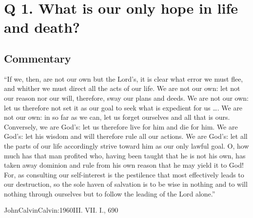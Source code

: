 \documentclass[00-main.tex]{subfiles}
\begin{document}
\section{Q  1. What is our only hope in life and death?}


\subsection{Commentary}
``If we, then, are not our own but the Lord's, it is clear what error we must flee, and whither we must direct all the acts of our life. We are not our own: let not our reason nor our will, therefore, sway our plans and deeds. We are not our own: let us therefore not set it as our goal to seek what is expedient for us \dots. We are not our own: in so far as we can, let us forget ourselves and all that is ours. Conversely, we are God's: let us therefore live for him and die for him. We are God's: let his wisdom and will therefore rule all our actions. We are God's: let all the parts of our life accordingly strive toward him as our only lawful goal. O, how much has that man profited who, having been taught that he is not his own, has taken away dominion and rule from his own reason that he may yield it to God! For, as consulting our self-interest is the pestilence that most effectively leads to our destruction, so the sole haven of salvation is to be wise in nothing and to will nothing through ourselves but to follow the leading of the Lord alone.''
\begin{NameCite}
	{John}{Calvin}{Calvin:1960}{III. VII. I., 690}
\end{NameCite}
\end{document}
